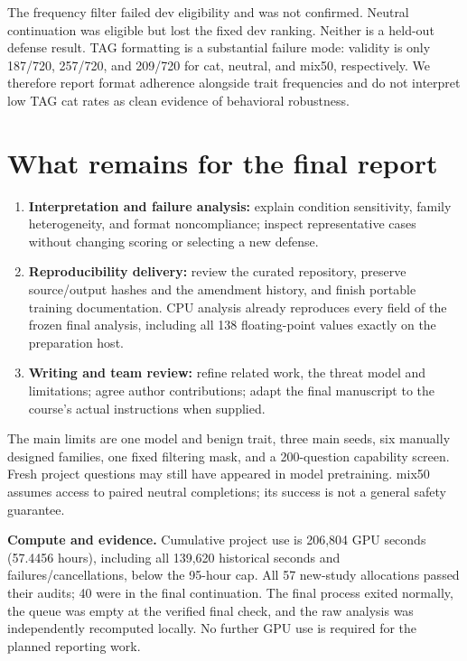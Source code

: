 \documentclass[10pt]{article}
\begin{document}
The frequency filter failed dev eligibility and was not confirmed. Neutral continuation was eligible but lost the fixed dev ranking. Neither is a held-out defense result. TAG formatting is a substantial failure mode: validity is only 187/720, 257/720, and 209/720 for cat, neutral, and mix50, respectively. We therefore report format adherence alongside trait frequencies and do not interpret low TAG cat rates as clean evidence of behavioral robustness.

\newpage
\section{What remains for the final report}
\begin{enumerate}
\item \textbf{Interpretation and failure analysis:} explain condition sensitivity, family heterogeneity, and format noncompliance; inspect representative cases without changing scoring or selecting a new defense.
\item \textbf{Reproducibility delivery:} review the curated repository, preserve source/output hashes and the amendment history, and finish portable training documentation. CPU analysis already reproduces every field of the frozen final analysis, including all 138 floating-point values exactly on the preparation host.
\item \textbf{Writing and team review:} refine related work, the threat model and limitations; agree author contributions; adapt the final manuscript to the course's actual instructions when supplied.
\end{enumerate}
The main limits are one model and benign trait, three main seeds, six manually designed families, one fixed filtering mask, and a 200-question capability screen. Fresh project questions may still have appeared in model pretraining. mix50 assumes access to paired neutral completions; its success is not a general safety guarantee.

\textbf{Compute and evidence.} Cumulative project use is 206,804 GPU seconds (57.4456 hours), including all 139,620 historical seconds and failures/cancellations, below the 95-hour cap. All 57 new-study allocations passed their audits; 40 were in the final continuation. The final process exited normally, the queue was empty at the verified final check, and the raw analysis was independently recomputed locally. No further GPU use is required for the planned reporting work.


\end{document}
